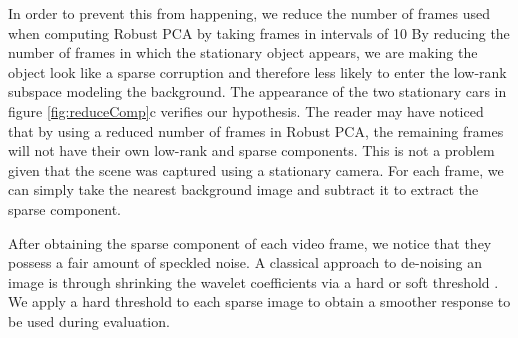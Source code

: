 \documentclass{article}
\begin{document}
In order to prevent this from happening, we reduce the number of frames used when computing Robust PCA by taking frames in intervals of 10 By reducing the number of frames in which the stationary object appears, we are making the object look like a sparse corruption and therefore less likely to enter the low-rank subspace modeling the background. The appearance of the two stationary cars in figure \ref{fig:reduceComp}c verifies our hypothesis. The reader may have noticed that by using a reduced number of frames in Robust PCA, the remaining frames will not have their own low-rank and sparse components. This is not a problem given that the scene was captured using a stationary camera. For each frame, we can simply take the nearest background image and subtract it to extract the sparse component.

After obtaining the sparse component of each video frame, we notice that they possess a fair amount of speckled noise. A classical approach to de-noising an image is through shrinking the wavelet coefficients via a hard or soft threshold \cite{Donoho95}. We apply a hard threshold to each sparse image to obtain a smoother response to be used during evaluation.
\end{document}
